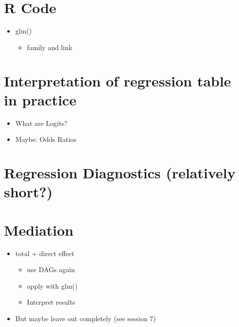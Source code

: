 \documentclass[
]{book}
\providecommand{\tightlist}{%
  \setlength{\itemsep}{0pt}\setlength{\parskip}{0pt}}
\begin{document}
\hypertarget{r-code-1}{%
\section{R Code}\label{r-code-1}}

\begin{itemize}
\tightlist
\item
  glm()

  \begin{itemize}
  \tightlist
  \item
    family and link
  \end{itemize}
\end{itemize}

\hypertarget{interpretation-of-regression-table-in-practice-1}{%
\section{Interpretation of regression table in practice}\label{interpretation-of-regression-table-in-practice-1}}

\begin{itemize}
\tightlist
\item
  What are Logits?
\item
  Maybe: Odds Ratios
\end{itemize}

\hypertarget{regression-diagnostics-relatively-short-1}{%
\section{Regression Diagnostics (relatively short?)}\label{regression-diagnostics-relatively-short-1}}

\hypertarget{mediation-1}{%
\section{Mediation}\label{mediation-1}}

\begin{itemize}
\tightlist
\item
  total + direct effect

  \begin{itemize}
  \tightlist
  \item
    use DAGs again
  \item
    apply with glm()
  \item
    Interpret results
  \end{itemize}
\item
  But maybe leave out completely (see session 7)
\end{itemize}
\end{document}
